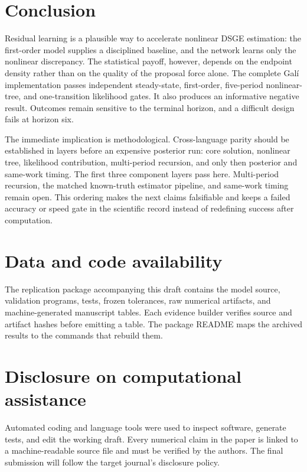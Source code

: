 \documentclass[11pt]{article}
\begin{document}
\section{Conclusion}

Residual learning is a plausible way to accelerate nonlinear DSGE estimation:
the first-order model supplies a disciplined baseline, and the network learns
only the nonlinear discrepancy. The statistical payoff, however, depends on
the endpoint density rather than on the quality of the proposal force alone.
The complete Gal\'i implementation passes independent steady-state,
first-order, five-period nonlinear-tree, and one-transition likelihood gates.
It also produces an informative negative result. Outcomes remain sensitive to
the terminal horizon, and a difficult design fails at horizon six.

The immediate implication is methodological. Cross-language parity should be
established in layers before an expensive posterior run: core solution,
nonlinear tree, likelihood contribution, multi-period recursion, and only then
posterior and same-work timing. The first three component layers pass here.
Multi-period recursion, the matched known-truth estimator pipeline, and
same-work timing remain open. This ordering makes the next claims falsifiable
and keeps a failed accuracy or speed gate in the scientific record instead of
redefining success after computation.

\section*{Data and code availability}

The replication package accompanying this draft contains the model source,
validation programs, tests, frozen tolerances, raw numerical artifacts, and
machine-generated manuscript tables. Each evidence builder verifies source and
artifact hashes before emitting a table. The package README maps the archived
results to the commands that rebuild them.

\section*{Disclosure on computational assistance}

Automated coding and language tools were used to inspect software, generate
tests, and edit the working draft. Every numerical claim in the paper is linked
to a machine-readable source file and must be verified by the authors. The final
submission will follow the target journal's disclosure policy.

\begingroup
\small


\endgroup
\end{document}
